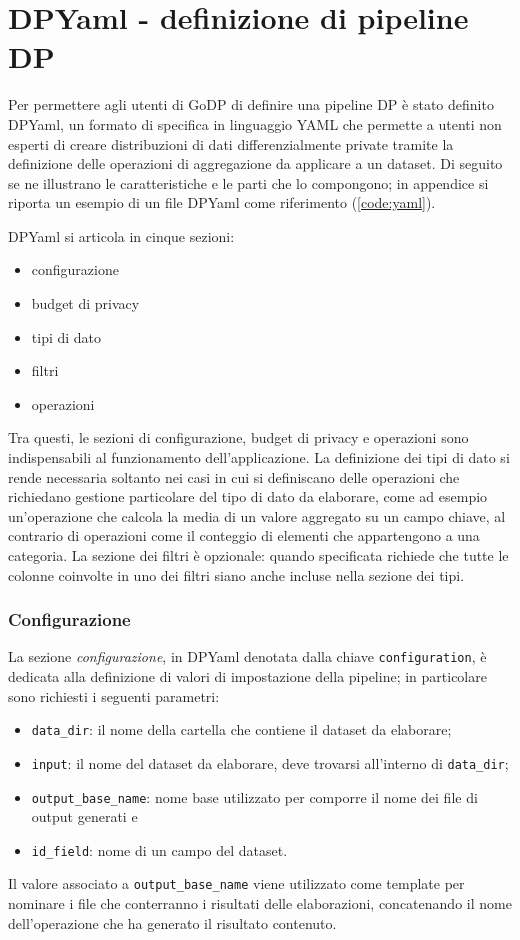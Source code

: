 \section{DPYaml - definizione di pipeline DP}
Per permettere agli utenti di GoDP di definire una pipeline DP è stato definito DPYaml, un formato di specifica in linguaggio YAML che permette a utenti non esperti di creare distribuzioni di dati differenzialmente private tramite la definizione delle operazioni di aggregazione da applicare a un dataset. Di seguito se ne illustrano le caratteristiche e le parti che lo compongono; in appendice si riporta un esempio di un file DPYaml come riferimento (\ref{code:yaml}).

DPYaml si articola in cinque sezioni:
\begin{itemize}
    \item configurazione
    \item budget di privacy
    \item tipi di dato
    \item filtri
    \item operazioni
\end{itemize}
Tra questi, le sezioni di configurazione, budget di privacy e operazioni sono indispensabili al funzionamento dell'applicazione. La definizione dei tipi di dato si rende necessaria soltanto nei casi in cui si definiscano delle operazioni che richiedano gestione particolare del tipo di dato da elaborare, come ad esempio un'operazione che calcola la media di un valore aggregato su un campo chiave, al contrario di operazioni come il conteggio di elementi che appartengono a una categoria. La sezione dei filtri è opzionale: quando specificata richiede che tutte le colonne coinvolte in uno dei filtri siano anche incluse nella sezione dei tipi.

\subsubsection{Configurazione}

La sezione \textit{configurazione}, in DPYaml denotata dalla chiave \texttt{configuration}, è dedicata alla definizione di valori di impostazione della pipeline; in particolare sono richiesti i seguenti parametri:
\begin{itemize}
    \item \texttt{data\_dir}: il nome della cartella che contiene il dataset da elaborare;
    \item \texttt{input}: il nome del dataset da elaborare, deve trovarsi all'interno di \texttt{data\_dir};
    \item \texttt{output\_base\_name}: nome base utilizzato per comporre il nome dei file di output generati e
    \item \texttt{id\_field}: nome di un campo del dataset.
\end{itemize}
Il valore associato a \texttt{output\_base\_name} viene utilizzato come template per nominare i file che conterranno i risultati delle elaborazioni, concatenando il nome dell'operazione che ha generato il risultato contenuto.

